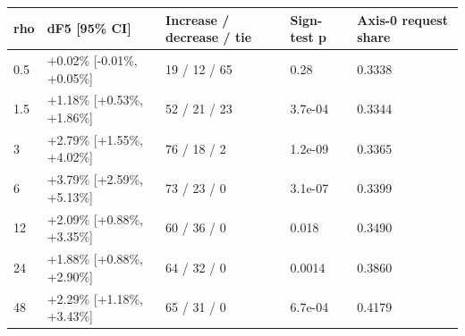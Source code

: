 \begin{tabular}{@{}lllll@{}}
\toprule
rho & dF5 [95\% CI] & Increase / decrease / tie & Sign-test p & Axis-0 request share \\
\midrule
0.5 & +0.02\% [-0.01\%, +0.05\%] & 19 / 12 / 65 & 0.28 & 0.3338 \\
1.5 & +1.18\% [+0.53\%, +1.86\%] & 52 / 21 / 23 & 3.7e-04 & 0.3344 \\
3 & +2.79\% [+1.55\%, +4.02\%] & 76 / 18 / 2 & 1.2e-09 & 0.3365 \\
6 & +3.79\% [+2.59\%, +5.13\%] & 73 / 23 / 0 & 3.1e-07 & 0.3399 \\
12 & +2.09\% [+0.88\%, +3.35\%] & 60 / 36 / 0 & 0.018 & 0.3490 \\
24 & +1.88\% [+0.88\%, +2.90\%] & 64 / 32 / 0 & 0.0014 & 0.3860 \\
48 & +2.29\% [+1.18\%, +3.43\%] & 65 / 31 / 0 & 6.7e-04 & 0.4179 \\
\bottomrule
\end{tabular}
